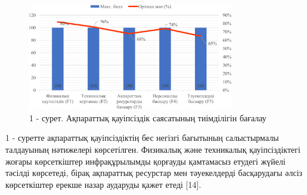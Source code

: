 \begin{figure}[H]
	\centering
	\includegraphics[width=0.8\textwidth]{media/ict4/image1}
	\caption*{1 - сурет. Ақпараттық қауіпсіздік саясатының тиімділігін бағалау}
\end{figure}

\begin{multicols}{2}
1 - суретте ақпараттық қауіпсіздіктің бес негізгі бағытының салыстырмалы
талдауының нәтижелері көрсетілген. Физикалық және техникалық
қауіпсіздіктегі жоғары көрсеткіштер инфрақұрылымды қорғауды қамтамасыз
етудегі жүйелі тәсілді көрсетеді, бірақ ақпараттық ресурстар мен
тәуекелдерді басқарудағы әлсіз көрсеткіштер ерекше назар аударуды қажет
етеді {[}14{]}.
\end{multicols}

